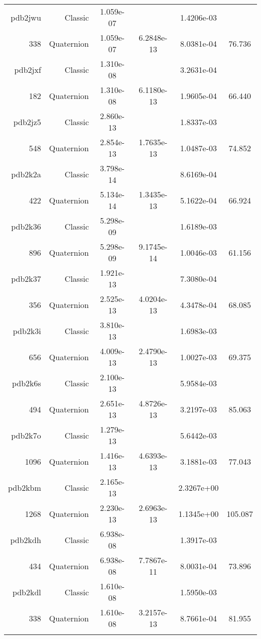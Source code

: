 \begin{xltabular}{\textwidth}{r|rS[table-format=1.3e+2]S[table-format=1.4e+2]S[table-format=1.4e+2]S[table-format=-1.3]}
pdb2jwu & Classic & 1.059e-07 &  & 1.4206e-03 & \\
338 & Quaternion & 1.059e-07 & 6.2848e-13 & 8.0381e-04 & 76.736\\  \addlinespace
pdb2jxf & Classic & 1.310e-08 &  & 3.2631e-04 & \\
182 & Quaternion & 1.310e-08 & 6.1180e-13 & 1.9605e-04 & 66.440\\  \addlinespace
pdb2jz5 & Classic & 2.860e-13 &  & 1.8337e-03 & \\
548 & Quaternion & 2.854e-13 & 1.7635e-13 & 1.0487e-03 & 74.852\\  \addlinespace
pdb2k2a & Classic & 3.798e-14 &  & 8.6169e-04 & \\
422 & Quaternion & 5.134e-14 & 1.3435e-13 & 5.1622e-04 & 66.924\\  \addlinespace
pdb2k36 & Classic & 5.298e-09 &  & 1.6189e-03 & \\
896 & Quaternion & 5.298e-09 & 9.1745e-14 & 1.0046e-03 & 61.156\\  \addlinespace
pdb2k37 & Classic & 1.921e-13 &  & 7.3080e-04 & \\
356 & Quaternion & 2.525e-13 & 4.0204e-13 & 4.3478e-04 & 68.085\\  \addlinespace
pdb2k3i & Classic & 3.810e-13 &  & 1.6983e-03 & \\
656 & Quaternion & 4.009e-13 & 2.4790e-13 & 1.0027e-03 & 69.375\\  \addlinespace
pdb2k6s & Classic & 2.100e-13 &  & 5.9584e-03 & \\
494 & Quaternion & 2.651e-13 & 4.8726e-13 & 3.2197e-03 & 85.063\\  \addlinespace
pdb2k7o & Classic & 1.279e-13 &  & 5.6442e-03 & \\
1096 & Quaternion & 1.416e-13 & 4.6393e-13 & 3.1881e-03 & 77.043\\  \addlinespace
pdb2kbm & Classic & 2.165e-13 &  & 2.3267e+00 & \\
1268 & Quaternion & 2.230e-13 & 2.6963e-13 & 1.1345e+00 & 105.087\\  \addlinespace
pdb2kdh & Classic & 6.938e-08 &  & 1.3917e-03 & \\
434 & Quaternion & 6.938e-08 & 7.7867e-11 & 8.0031e-04 & 73.896\\  \addlinespace
pdb2kdl & Classic & 1.610e-08 &  & 1.5950e-03 & \\
338 & Quaternion & 1.610e-08 & 3.2157e-13 & 8.7661e-04 & 81.955\\  \addlinespace

\end{xltabular}
